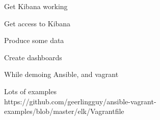 \documentclass[20pt,landscape,a4paper,footrule]{foils}
\begin{document}

\begin{list2}
\item Get Kibana working
\item Get access to Kibana
\item Produce some data
\item Create dashboards
\end{list2}

While demoing Ansible, and vagrant

Lots of examples\\
https://github.com/geerlingguy/ansible-vagrant-examples/blob/master/elk/Vagrantfile


\myquestionspage





\end{document}

